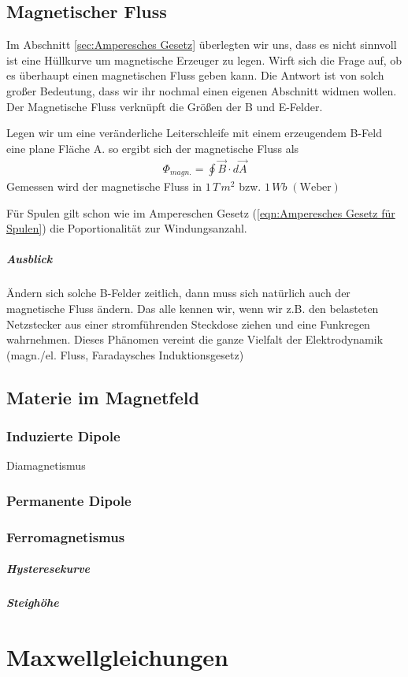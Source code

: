 \subsection{Magnetischer Fluss}
Im Abschnitt \ref{sec:Amperesches Gesetz} überlegten wir uns, dass es nicht sinnvoll ist eine Hüllkurve um magnetische Erzeuger zu legen. Wirft sich die Frage auf, ob es überhaupt einen magnetischen Fluss geben kann. Die Antwort ist von solch großer Bedeutung, dass wir ihr nochmal einen eigenen Abschnitt widmen wollen. 
Der Magnetische Fluss verknüpft die Größen der B und E-Felder.

Legen wir um eine veränderliche Leiterschleife mit einem erzeugendem B-Feld eine plane Fläche A. so ergibt sich der magnetische Fluss als
\begin{align} \label{eqn:magn. fluss}
\boxed{\Phi_{magn.} = \oint \limits \vec{B} \cdot d\vec{A}}
\end{align}
Gemessen wird der magnetische Fluss in $1\, T  \, m^2$ bzw. $1 \, Wb \; \mathrm{(Weber)}$

Für Spulen gilt schon wie im Ampereschen Gesetz (\ref{eqn:Amperesches Gesetz für Spulen}) die Poportionalität zur Windungsanzahl.
\subparagraph{Ausblick} Ändern sich solche B-Felder zeitlich, dann muss sich natürlich auch der magnetische Fluss ändern. Das alle kennen wir, wenn wir z.B. den belasteten  Netzstecker aus einer stromführenden Steckdose ziehen und eine Funkregen wahrnehmen. Dieses Phänomen vereint die ganze Vielfalt der Elektrodynamik (magn./el. Fluss, Faradaysches Induktionsgesetz)

\subsection{Materie im Magnetfeld}
\subsubsection{Induzierte Dipole} Diamagnetismus
\subsubsection{Permanente Dipole}
\subsubsection{Ferromagnetismus}
\subparagraph{Hysteresekurve}
\subparagraph{Steighöhe}

\section{Maxwellgleichungen}